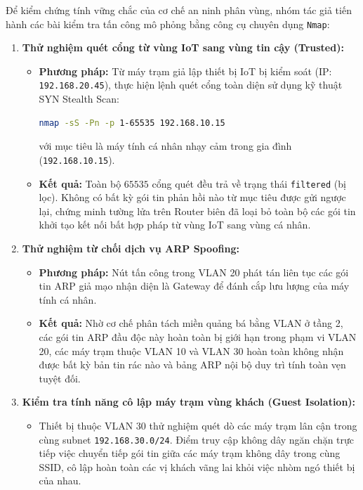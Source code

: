 Để kiểm chứng tính vững chắc của cơ chế an ninh phân vùng, nhóm tác giả tiến hành các bài kiểm tra tấn công mô phỏng bằng công cụ chuyên dụng \texttt{Nmap}:
\begin{enumerate}
    \item \textbf{Thử nghiệm quét cổng từ vùng IoT sang vùng tin cậy (Trusted):}
    \begin{itemize}
        \item \textbf{Phương pháp:} Từ máy trạm giả lập thiết bị IoT bị kiểm soát (IP: \texttt{192.168.20.45}), thực hiện lệnh quét cổng toàn diện sử dụng kỹ thuật SYN Stealth Scan:
\begin{lstlisting}[language=bash]
nmap -sS -Pn -p 1-65535 192.168.10.15
\end{lstlisting}
        với mục tiêu là máy tính cá nhân nhạy cảm trong gia đình (\texttt{192.168.10.15}).
        \item \textbf{Kết quả:} Toàn bộ $65535$ cổng quét đều trả về trạng thái \texttt{filtered} (bị lọc). Không có bất kỳ gói tin phản hồi nào từ mục tiêu được gửi ngược lại, chứng minh tường lửa trên Router biên đã loại bỏ toàn bộ các gói tin khởi tạo kết nối bất hợp pháp từ vùng IoT sang vùng cá nhân.
    \end{itemize}
    \item \textbf{Thử nghiệm từ chối dịch vụ ARP Spoofing:}
    \begin{itemize}
        \item \textbf{Phương pháp:} Nút tấn công trong VLAN 20 phát tán liên tục các gói tin ARP giả mạo nhận diện là Gateway để đánh cắp lưu lượng của máy tính cá nhân.
        \item \textbf{Kết quả:} Nhờ cơ chế phân tách miền quảng bá bằng VLAN ở tầng 2, các gói tin ARP đầu độc này hoàn toàn bị giới hạn trong phạm vi VLAN 20, các máy trạm thuộc VLAN 10 và VLAN 30 hoàn toàn không nhận được bất kỳ bản tin rác nào và bảng ARP nội bộ duy trì tính toàn vẹn tuyệt đối.
    \end{itemize}
    \item \textbf{Kiểm tra tính năng cô lập máy trạm vùng khách (Guest Isolation):}
    \begin{itemize}
        \item Thiết bị thuộc VLAN 30 thử nghiệm quét dò các máy trạm lân cận trong cùng subnet \texttt{192.168.30.0/24}. Điểm truy cập không dây ngăn chặn trực tiếp việc chuyển tiếp gói tin giữa các máy trạm không dây trong cùng SSID, cô lập hoàn toàn các vị khách vãng lai khỏi việc nhòm ngó thiết bị của nhau.
    \end{itemize}
\end{enumerate}

